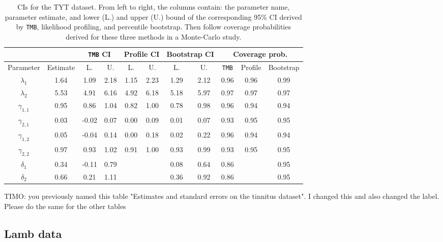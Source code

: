 \documentclass[bimj,fleqn]{w-art}\usepackage[]{graphicx}\usepackage[]{color}
\theoremstyle{plain}
\theoremstyle{definition}
\begin{document}
\begin{table}[ht]
\centering
\begin{tabular}{ccccccccccc}
  && \multicolumn{2}{c}{{\tt TMB} CI}& \multicolumn{2}{c}{Profile CI}& \multicolumn{2}{c}{Bootstrap CI}& \multicolumn{3}{c}{Coverage prob.}\\ \hline
Parameter & Estimate & L. & U. & L. & U. & L. & U. & {\tt TMB} & Profile & Bootstrap \\ 
  \hline
$\lambda_{1}$ & 1.64 & 1.09 & 2.18 & 1.15 & 2.23 & 1.29 & 2.12 & 0.96 & 0.96 & 0.99 \\ 
  $\lambda_{2}$ & 5.53 & 4.91 & 6.16 & 4.92 & 6.18 & 5.18 & 5.97 & 0.97 & 0.97 & 0.97 \\ 
  $\gamma_{1, 1}$ & 0.95 & 0.86 & 1.04 & 0.82 & 1.00 & 0.78 & 0.98 & 0.96 & 0.94 & 0.94 \\ 
  $\gamma_{2, 1}$ & 0.03 & -0.02 & 0.07 & 0.00 & 0.09 & 0.01 & 0.07 & 0.93 & 0.95 & 0.95 \\ 
  $\gamma_{1, 2}$ & 0.05 & -0.04 & 0.14 & 0.00 & 0.18 & 0.02 & 0.22 & 0.96 & 0.94 & 0.94 \\ 
  $\gamma_{2, 2}$ & 0.97 & 0.93 & 1.02 & 0.91 & 1.00 & 0.93 & 0.99 & 0.93 & 0.95 & 0.95 \\ 
  $\delta_{1}$ & 0.34 & -0.11 & 0.79 &  &  & 0.08 & 0.64 & 0.86 &  & 0.95 \\ 
  $\delta_{2}$ & 0.66 & 0.21 & 1.11 &  &  & 0.36 & 0.92 & 0.86 &  & 0.95 \\ 
   \hline
\end{tabular}
\caption{CIs for the TYT dataset. From left to right, the columns contain: the parameter name, parameter estimate, and lower (L.) and upper (U.) bound of the corresponding 95\% CI derived by {\tt TMB}, likelihood profiling, and percentile bootstrap. Then follow coverage probabilities derived for these three methods in a Monte-Carlo study.} 
\label{table:tinn_cis}
\end{table}


TIMO: you previously named this table "Estimates and standard errors on the tinnitus dataset". I changed this and also changed the label. Please do the same for the other tables



\subsection{Lamb data}
\label{sec:lamb_data}
\end{document}
